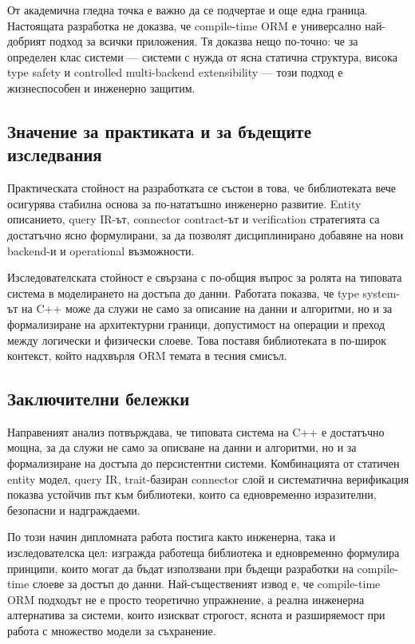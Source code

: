 От академична гледна точка е важно да се подчертае и още една граница. Настоящата разработка не доказва, че compile-time ORM е универсално най-добрият подход за всички приложения. Тя доказва нещо по-точно: че за определен клас системи --- системи с нужда от ясна статична структура, висока type safety и controlled multi-backend extensibility --- този подход е жизнеспособен и инженерно защитим.

\subsection{Значение за практиката и за бъдещите изследвания}

Практическата стойност на разработката се състои в това, че библиотеката вече осигурява стабилна основа за по-нататъшно инженерно развитие. Entity описанието, query IR-ът, connector contract-ът и verification стратегията са достатъчно ясно формулирани, за да позволят дисциплинирано добавяне на нови backend-и и operational възможности.

Изследователската стойност е свързана с по-общия въпрос за ролята на типовата система в моделирането на достъпа до данни. Работата показва, че type system-ът на C++ може да служи не само за описание на данни и алгоритми, но и за формализиране на архитектурни граници, допустимост на операции и преход между логически и физически слоеве. Това поставя библиотеката в по-широк контекст, който надхвърля ORM темата в тесния смисъл.

\subsection{Заключителни бележки}

Направеният анализ потвърждава, че типовата система на C++ е достатъчно мощна, за да служи не само за описване на данни и алгоритми, но и за формализиране на достъпа до персистентни системи. Комбинацията от статичен entity модел, query IR, trait-базиран connector слой и систематична верификация показва устойчив път към библиотеки, които са едновременно изразителни, безопасни и надграждаеми.

По този начин дипломната работа постига както инженерна, така и изследователска цел: изгражда работеща библиотека и едновременно формулира принципи, които могат да бъдат използвани при бъдещи разработки на compile-time слоеве за достъп до данни. Най-същественият извод е, че compile-time ORM подходът не е просто теоретично упражнение, а реална инженерна алтернатива за системи, които изискват строгост, яснота и разширяемост при работа с множество модели за съхранение.
